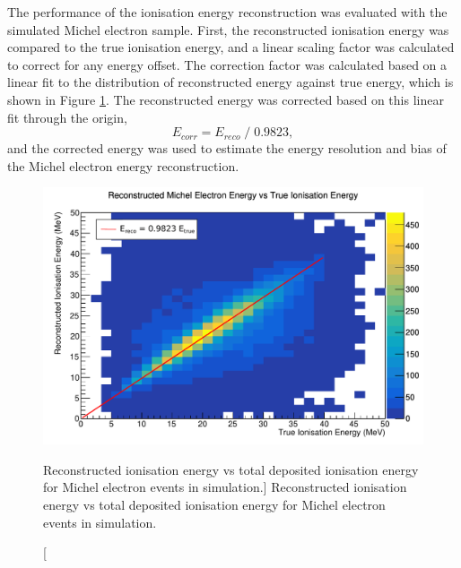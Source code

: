 The performance of the ionisation energy reconstruction was evaluated with the
simulated Michel electron sample. First, the reconstructed ionisation energy was
compared to the true ionisation energy, and a linear scaling factor was
calculated to correct for any energy offset. The correction factor was
calculated based on a linear fit to the distribution of reconstructed energy
against true energy, which is shown in Figure \ref{fig:reco_v_ion}. The
reconstructed energy was corrected based on this linear fit through the origin,
\begin{equation*}
	E_{corr} = E_{reco} \; / \; 0.9823,
\end{equation*}
and the corrected energy was used to estimate the energy resolution and bias of
the Michel electron energy reconstruction.
\begin{figure}
	\centering
	\includegraphics[width=\textwidth]{figures/reco_v_true_ion.pdf}
	\caption
	[Reconstructed ionisation energy vs total deposited ionisation energy for
	Michel electron events in \protodune{} simulation.]
	{ Reconstructed ionisation energy vs total deposited ionisation energy for
	Michel electron events in \protodune{} simulation. }
	\label{fig:reco_v_ion}
\end{figure}

